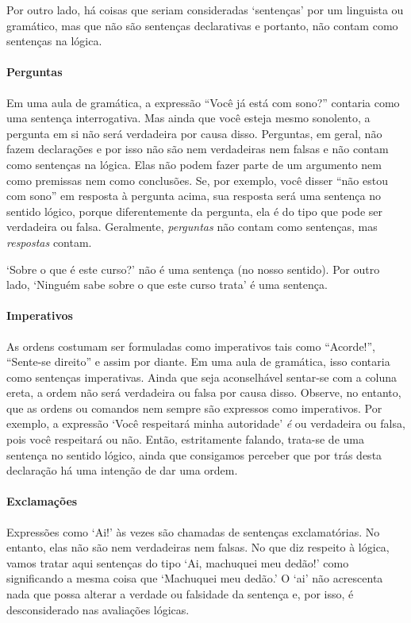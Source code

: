 Por outro lado, há coisas que seriam consideradas `sentenças' por um linguista ou gramático, mas que não são sentenças declarativas e portanto, não contam como sentenças na lógica.

\paragraph{Perguntas}  Em uma aula de gramática, a expressão ``Você já está com sono?'' contaria como uma sentença interrogativa. Mas ainda que você esteja mesmo sonolento, a pergunta em si não será verdadeira por causa disso.
Perguntas, em geral, não fazem declarações e por isso não são nem verdadeiras nem falsas e não contam como sentenças na lógica.
Elas não podem fazer parte de um argumento nem como premissas nem como conclusões.
Se, por exemplo, você disser ``não estou com sono'' em resposta à pergunta acima, sua resposta será uma sentença no sentido lógico, porque diferentemente da pergunta, ela é do tipo que pode ser verdadeira ou falsa.
Geralmente, \emph{perguntas} não contam como sentenças, mas \emph{respostas} contam.

`Sobre o que é este curso?' não é uma sentença (no nosso sentido).
Por outro lado, `Ninguém sabe sobre o que este curso trata' é uma sentença.

\paragraph{Imperativos} As ordens costumam ser formuladas como imperativos tais como ``Acorde!'', ``Sente-se direito'' e assim por diante.
Em uma aula de gramática, isso contaria como sentenças imperativas.
Ainda que seja aconselhável sentar-se com a coluna ereta, a ordem não será verdadeira ou falsa por causa disso.
Observe, no entanto, que as ordens ou comandos nem sempre são expressos como imperativos.
Por exemplo, a expressão `Você respeitará minha autoridade' \emph{é} ou verdadeira ou falsa, pois você respeitará ou não.
Então, estritamente falando, trata-se de uma sentença no sentido lógico, ainda que consigamos perceber que por trás desta declaração há uma intenção de dar uma ordem.

\paragraph{Exclamações} Expressões como `Ai!' às vezes são chamadas de sentenças exclamatórias.
No entanto, elas não são nem verdadeiras nem falsas.
No que diz respeito à lógica, vamos tratar aqui sentenças do tipo `Ai, machuquei meu dedão!' como significando a mesma coisa que `Machuquei meu dedão.'
O `ai' não acrescenta nada que possa alterar a verdade ou falsidade da sentença e, por isso, é desconsiderado nas avaliações lógicas.


